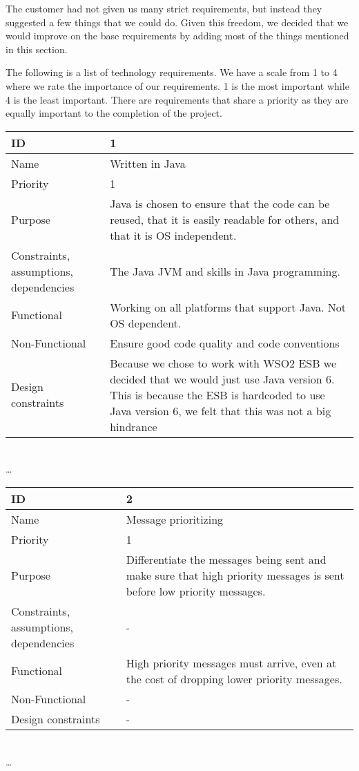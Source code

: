     The customer had not given us many strict requirements, but instead they suggested a few things that we could do. Given this freedom, we decided that we would improve on the base requirements by adding most of the things mentioned in this section. 

    The following is a list of technology requirements. We have a scale from 1 to 4 where we rate the importance of our requirements. 1 is the most important while 4 is the least important. There are requirements that share a priority as they are equally important to the completion of the project. \\
    
\begin{center}
	\begin{tabular}{| p{4cm} | p{8cm} |}
		\hline
		ID & 1 \\
		\hline
		Name & Written in Java  \\
		\hline
		Priority & 1 \\
		\hline
		Purpose & Java is chosen to ensure that the code can be reused, that it is easily readable for others, and that it is OS independent. \\
		\hline 
		Constraints, assumptions, dependencies & The Java JVM and skills in Java programming. \\
		\hline  
		Functional & Working on all platforms that support Java. Not OS dependent. \\
		\hline
		Non-Functional & Ensure good code quality and code conventions \\ 
		\hline
		Design constraints & Because we chose to work with WSO2 ESB we decided that we would just use Java version 6. This is because the ESB is hardcoded to use Java version 6, we felt that this was not a big hindrance  \\
		\hline
	\end{tabular}
	\\  \ldots  \\

	\begin{tabular}{| p{4cm} | p{8cm} |}
		\hline
		ID & 2 \\
		\hline
		Name & Message prioritizing \\
		\hline
		Priority & 1 \\
		\hline
		Purpose & Differentiate the messages being sent and make sure that high priority messages is sent before low priority messages. \\
		\hline 
		Constraints, assumptions, dependencies & -\\
		\hline  
		Functional & High priority messages must arrive, even at the cost of dropping lower priority messages.  \\
		\hline
		Non-Functional & - \\ 
		\hline
		Design constraints & - \\
		\hline
	\end{tabular}
	\\  \ldots  \\


\end{center}
